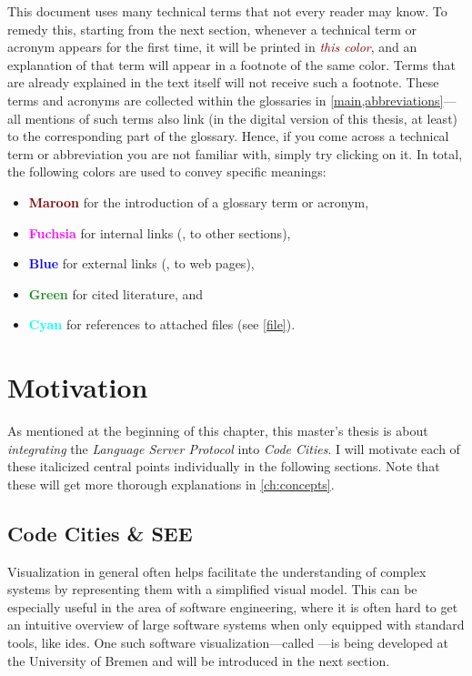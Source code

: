 \documentclass[../thesis]{subfiles}
\begin{document}
This document uses many technical terms that not every reader may know.
To remedy this, starting from the next section, whenever a technical term or acronym appears for the first time, it will be printed in \emph{\textcolor{Maroon}{this color}}, and an explanation of that term will appear in a footnote of the same color.
Terms that are already explained in the text itself will not receive such a footnote.
These terms and acronyms are collected within the glossaries in \cref{main,abbreviations}---all mentions of such terms also link (in the digital version of this thesis, at least) to the corresponding part of the glossary.
Hence, if you come across a technical term or abbreviation you are not familiar with, simply try clicking on it.
In total, the following colors are used to convey specific meanings:
\begin{itemize}
	\item \textbf{\textcolor{Maroon}{Maroon}} for the introduction of a glossary term or acronym,
	\item \textbf{\textcolor{Fuchsia}{Fuchsia}} for internal links (\eg, to other sections),
	\item \textbf{\textcolor{Blue}{Blue}} for external links (\eg, to web pages),
	\item \textbf{\textcolor{ForestGreen}{Green}} for cited literature, and
	\item \textbf{\textcolor{Cyan}{Cyan}} for references to attached files (see \cref{file}).
\end{itemize}

\section{Motivation}
As mentioned at the beginning of this chapter, this master's thesis is about \emph{integrating} the \emph{Language Server Protocol} into \emph{Code Cities}.
I will motivate each of these italicized central points individually in the following sections.
Note that these will get more thorough explanations in \cref{ch:concepts}.

\subsection{Code Cities \& SEE}\label{subsec:see}
Visualization in general often helps facilitate the understanding of complex systems by representing them with a simplified visual model.
This can be especially useful in the area of software engineering, where it is often hard to get an intuitive overview of large software systems when only equipped with standard tools, like \glspl{ide}.
One such software visualization---called \SEE{}---is being developed at the University of Bremen and will be introduced in the next section.
\end{document}
